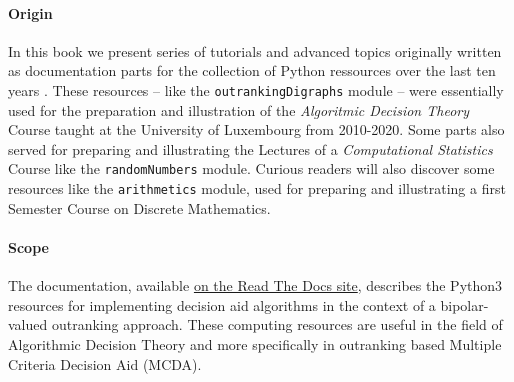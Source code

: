 %
%

\preface





\paragraph{Origin}
In this book we present series of tutorials and advanced topics originally written as documentation parts for the \Digraph collection of Python ressources over the last ten years \citep{BIS-2021}. These \Digraph resources -- like the \texttt{outrankingDigraphs} module -- were essentially used for the preparation and illustration of the \emph{Algoritmic Decision Theory} Course taught at the University of Luxembourg from 2010-2020. Some parts also served for preparing and illustrating the Lectures of a \emph{Computational Statistics} Course like the \texttt{randomNumbers} module. Curious readers will also discover some resources like the \texttt{arithmetics} module, used for preparing and illustrating a first Semester Course on Discrete Mathematics.


\paragraph{Scope}

The \Digraph documentation, available \href{https://digraph3.readthedocs.io/en/latest/}{on the Read The Docs site}, describes the Python3 resources for implementing decision aid algorithms in the context of a bipolar-valued outranking approach. These computing resources are useful in the field of Algorithmic Decision Theory and more specifically in outranking based Multiple Criteria Decision Aid (MCDA).

